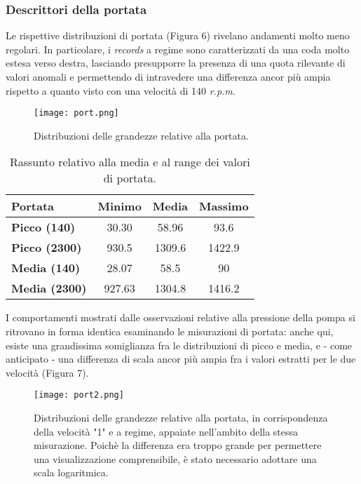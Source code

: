 \documentclass[fleqn,10pt]{SelfArx} %
\begin{document}
\subsubsection{Descrittori della portata}
Le rispettive distribuzioni di portata (Figura 6) rivelano andamenti molto meno regolari. In particolare, i \textit{records} a regime sono caratterizzati da una coda molto estesa verso destra, lasciando presupporre la presenza di una  quota rilevante di valori anomali e permettendo di intravedere una differenza ancor più ampia rispetto a quanto visto con una velocità di 140 \textit{r.p.m}.  
\begin{figure}[h]
    \centering
    \texttt{[image: port.png]}
    \label{fig:em}
    \caption{Distribuzioni delle grandezze relative alla portata.}
\end{figure}
{\begin{table}[h]
\centering
\begin{tabular}[t]{lccc}
\toprule
Portata&Minimo&Media&Massimo\\
\midrule
\textbf{Picco (140)}&30.30&58.96&93.6\\
\textbf{Picco (2300)}&930.5&1309.6&1422.9\\
\textbf{Media (140)}&28.07&58.5&90\\
\textbf{Media (2300)}&927.63&1304.8&1416.2\\
\bottomrule
\end{tabular}
\caption{Rassunto relativo alla media e al range dei valori di portata.}
\end{table}}
I comportamenti mostrati dalle osservazioni relative alla pressione della pompa si ritrovano in forma identica esaminando le misurazioni di portata: anche qui, esiste una grandissima somiglianza fra le distribuzioni di picco e media, e - come anticipato - una differenza di scala ancor più ampia fra i valori estratti per le due velocità (Figura 7).
\begin{figure}[h]
    \centering
    \texttt{[image: port2.png]}
    \label{fig:em}
    \caption{Distribuzioni delle grandezze relative alla portata, in corrispondenza della velocità "1" e a regime, appaiate nell'ambito della stessa misurazione. Poichè la differenza era troppo grande per permettere una visualizzazione comprensibile, è stato necessario adottare una scala logaritmica.}
\end{figure}
\end{document}
